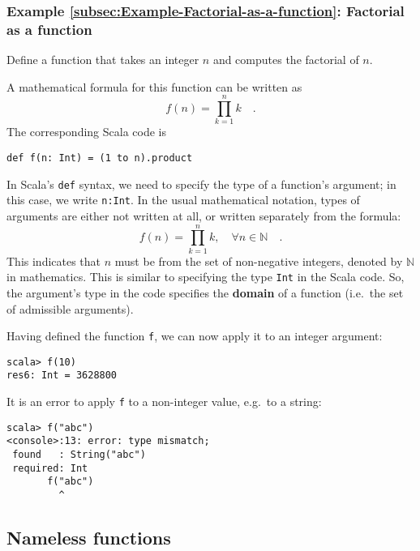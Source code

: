 \subsubsection{Example \label{subsec:Example-Factorial-as-a-function}\ref{subsec:Example-Factorial-as-a-function}:
Factorial as a function}

Define a function that takes an integer $n$ and computes the factorial
of $n$.

A mathematical formula for this function can be written as
\[
f\left(n\right)=\prod_{k=1}^{n}k\quad.
\]
The corresponding Scala code is
\begin{lstlisting}
def f(n: Int) = (1 to n).product
\end{lstlisting}

In Scala\textsf{'}s \texttt{}\lstinline!def! syntax, we need to specify the
type of a function\textsf{'}s argument; in this case, we write \lstinline!n:Int!.
In the usual mathematical notation, types of arguments are either
not written at all, or written separately from the formula:
\[
f(n)=\prod_{k=1}^{n}k,\quad\forall n\in\mathbb{N}\quad.
\]
This indicates that $n$ must be from the set of non-negative integers,
denoted by $\mathbb{N}$ in mathematics. This is similar to specifying
the type \texttt{}\lstinline!Int! in the Scala code. So, the argument\textsf{'}s
type in the code specifies the \textbf{domain} of a function
(i.e.~the set of admissible arguments).

Having defined the function \lstinline!f!, we can now apply it to
an integer argument: 
\begin{lstlisting}
scala> f(10)
res6: Int = 3628800
\end{lstlisting}
It is an error to apply \lstinline!f! to a non-integer value, e.g.\ to
a string:
\begin{lstlisting}
scala> f("abc")
<console>:13: error: type mismatch;
 found   : String("abc")
 required: Int
       f("abc")
         ^ 
\end{lstlisting}


\subsection{Nameless functions\label{subsec:Nameless-functions}}

